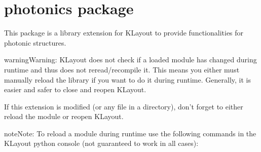 \documentclass[a4paper,10pt,english]{sphinxmanual}
\begin{document}
\begin{sphinxVerbatim}[commandchars=\\\{\}]
                     
\end{sphinxVerbatim}


\section{photonics package}
\label{\detokenize{photonics:photonics-package}}\label{\detokenize{photonics::doc}}
This package is a library extension for KLayout to provide functionalities for photonic structures.

\begin{sphinxadmonition}{warning}{Warning:}
KLayout does not check if a loaded module has changed during runtime and thus does not reread/recompile it.
This means you either must manually reload the library if you want to do it during runtime. Generally, it is easier and
safer to close and reopen KLayout.

If this extension is modified (or any file in a  directory), don’t forget to either reload the module or
reopen KLayout.

\begin{sphinxadmonition}{note}{Note:}
To reload a module during runtime use the following commands in the KLayout python console (not guaranteed to work in all cases):

%
\begin{sphinxVerbatim}[commandchars=\\\{\}]
   
 
\end{sphinxVerbatim}
\end{sphinxadmonition}
\end{sphinxadmonition}
\end{document}
